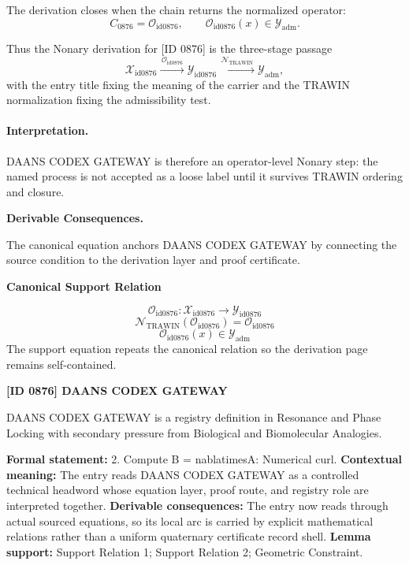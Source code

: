 The derivation closes when the chain returns the normalized operator:\[
C_{0876}=\mathcal{O}_{\mathrm{id0876}},\qquad \mathcal{O}_{\mathrm{id0876}}(x)\in\mathcal{Y}_{\mathrm{adm}}.
\]

Thus the Nonary derivation for [ID 0876] is the three-stage passage
\[
\mathcal{X}_{\mathrm{id0876}}\xrightarrow{\,\mathcal{O}_{\mathrm{id0876}}\,} \mathcal{Y}_{\mathrm{id0876}}\xrightarrow{\,\mathcal{N}_{\mathrm{TRAWIN}}\,} \mathcal{Y}_{\mathrm{adm}},
\]
with the entry title fixing the meaning of the carrier and the TRAWIN normalization fixing the admissibility test.

\paragraph{Interpretation.} DAANS CODEX GATEWAY is therefore an operator-level Nonary step: the named process is not accepted as a loose label until it survives TRAWIN ordering and closure.

\par\vspace{0.35em}
\noindent\textbf{Derivable Consequences.}\quad
\begingroup
\footnotesize
\raggedright
The canonical equation anchors DAANS CODEX GATEWAY by connecting the source condition to the derivation layer and proof certificate.
\par\endgroup

\noindent\textbf{Canonical Support Relation}\par
\[
\mathcal{O}_{\mathrm{id0876}}:\mathcal{X}_{\mathrm{id0876}}\longrightarrow\mathcal{Y}_{\mathrm{id0876}}
\]
\[
\mathcal{N}_{\mathrm{TRAWIN}}(\mathcal{O}_{\mathrm{id0876}})=\mathcal{O}_{\mathrm{id0876}}
\]
\[
\mathcal{O}_{\mathrm{id0876}}(x)\in\mathcal{Y}_{\mathrm{adm}}
\]
\noindent The support equation repeats the canonical relation so the derivation page remains self-contained.\par

\clearpage
\noindent\textbf{[ID 0876] DAANS CODEX GATEWAY}\par
\vspace{0.35em}
\begingroup\small
{}
DAANS CODEX GATEWAY is a registry definition in Resonance and Phase Locking with secondary pressure from Biological and Biomolecular Analogies.

\begingroup\footnotesize\setlength{\emergencystretch}{3em}\sloppy
\textbf{Formal statement:} 2. Compute B = nablatimesA: Numerical curl. \textbf{Contextual meaning:} The entry reads DAANS CODEX GATEWAY as a controlled technical headword whose equation layer, proof route, and registry role are interpreted together. \textbf{Derivable consequences:} The entry now reads through actual sourced equations, so its local arc is carried by explicit mathematical relations rather than a uniform quaternary certificate record shell. \textbf{Lemma support:} Support Relation 1; Support Relation 2; Geometric Constraint.\par
\endgroup

